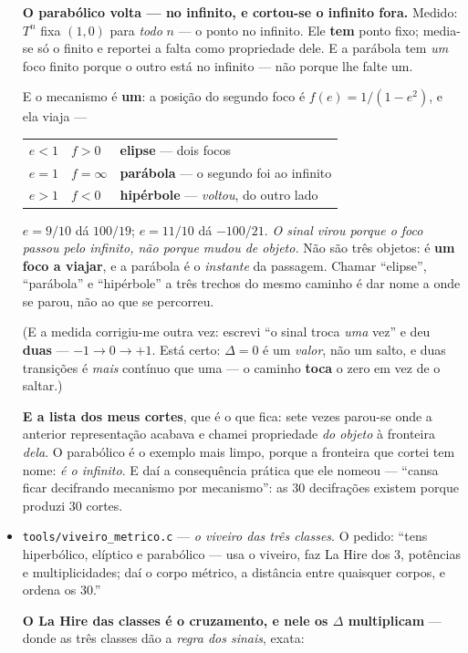 \documentclass[11pt]{article}
\newcommand{\code}[1]{\texttt{\small #1}}
\theoremstyle{plain}
\theoremstyle{remark}
\begin{document}
\begin{itemize}
\textbf{O parabólico volta --- no infinito, e cortou-se o infinito fora.} Medido: $T^n$ fixa
$(1,0)$ para \emph{todo} $n$ --- o ponto no infinito. Ele \textbf{tem} ponto fixo; media-se só o
finito e reportei a falta como propriedade dele. E a parábola tem \emph{um} foco finito porque o
outro está no infinito --- não porque lhe falte um.

E o mecanismo é \textbf{um}: a posição do segundo foco é $f(e) = 1/(1-e^2)$, e ela viaja ---

\begin{center}\begin{tabular}{lll}
$e<1$ & $f>0$ & \textbf{elipse} --- dois focos \\
$e=1$ & $f=\infty$ & \textbf{parábola} --- o segundo foi ao infinito \\
$e>1$ & $f<0$ & \textbf{hipérbole} --- \emph{voltou}, do outro lado \\
\end{tabular}\end{center}

$e=9/10$ dá $100/19$; $e=11/10$ dá $-100/21$. \emph{O sinal virou porque o foco passou pelo
infinito, não porque mudou de objeto.} Não são três objetos: é \textbf{um foco a viajar}, e a
parábola é o \emph{instante} da passagem. Chamar ``elipse'', ``parábola'' e ``hipérbole'' a três
trechos do mesmo caminho é dar nome a onde se parou, não ao que se percorreu.

(E a medida corrigiu-me outra vez: escrevi ``o sinal troca \emph{uma} vez'' e deu \textbf{duas} ---
$-1 \to 0 \to +1$. Está certo: $\Delta=0$ é um \emph{valor}, não um salto, e duas transições é
\emph{mais} contínuo que uma --- o caminho \textbf{toca} o zero em vez de o saltar.)

\textbf{E a lista dos meus cortes}, que é o que fica: sete vezes parou-se onde a anterior
representação acabava e chamei propriedade \emph{do objeto} à fronteira \emph{dela}. O parabólico
é o exemplo mais limpo, porque a fronteira que cortei tem nome: \emph{é o infinito}. E daí a
consequência prática que ele nomeou --- ``cansa ficar decifrando mecanismo por mecanismo'': as
$30$ decifrações existem porque produzi $30$ cortes.
\item \code{tools/viveiro\_metrico.c} --- \emph{o viveiro das três classes}. O pedido: ``tens
hiperbólico, elíptico e parabólico --- usa o viveiro, faz La Hire dos $3$, potências e
multiplicidades; daí o corpo métrico, a distância entre quaisquer corpos, e ordena os $30$.''

\textbf{O La Hire das classes é o cruzamento, e nele os $\Delta$ multiplicam} --- donde as três
classes dão a \emph{regra dos sinais}, exata:


\end{itemize}
\end{document}
